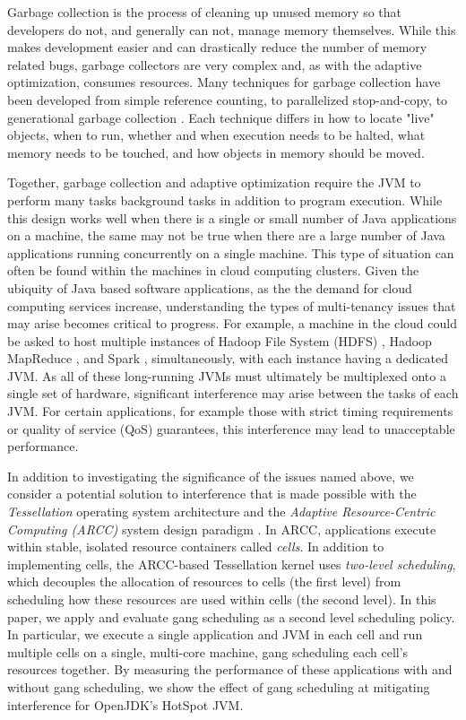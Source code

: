 \documentclass{sig-alternate}
\begin{document}
Garbage collection is the process of cleaning up unused memory so that developers do not, and generally can not, manage memory themselves. While this makes development easier and can drastically reduce the number of memory related bugs, garbage collectors are very complex and, as with the adaptive optimization, consumes resources. Many techniques for garbage collection have been developed from simple reference counting, to parallelized stop-and-copy, to generational garbage collection \cite{lins1996garbage}. Each technique differs in how to locate "live" objects, when to run, whether and when execution needs to be halted, what memory needs to be touched, and how objects in memory should be moved.

Together, garbage collection and adaptive optimization require the JVM to perform many tasks background tasks in addition to program execution. While this design works well when there is a single or small number of Java applications on a machine, the same may not be true when there are a large number of Java applications running concurrently on a single machine. This type of situation can often be found within the machines in cloud computing clusters. Given the ubiquity of Java based software applications, as the the demand for cloud computing services increase, understanding the types of multi-tenancy issues that may arise becomes critical to progress. For example, a machine in the cloud could be asked to host multiple instances of Hadoop File System (HDFS) \cite{shvachko2010hadoop}, Hadoop MapReduce \cite{bialecki2005hadoop}, and Spark \cite{zaharia2010spark}, simultaneously, with each instance having a dedicated JVM. As all of these long-running JVMs must ultimately be multiplexed onto a single set of hardware, significant interference may arise between the tasks of each JVM. For certain applications, for example those with strict timing requirements or quality of service (QoS) guarantees, this interference may lead to unacceptable performance.

In addition to investigating the significance of the issues named above, we consider a potential solution to interference that is made possible with the \textit{Tessellation} operating system architecture and the \textit{Adaptive Resource-Centric Computing (ARCC)} system design paradigm \cite{colmenares2010resource, colmenares2013tessellation, liu2009tessellation}. In ARCC, applications execute within stable, isolated resource containers called \textit{cells}. In addition to implementing cells, the ARCC-based Tessellation kernel uses \textit{two-level scheduling}, which decouples the allocation of resources to cells (the first level) from scheduling how these resources are used within cells (the second level). In this paper, we apply and evaluate gang scheduling \cite{feitelson1992gang} as a second level scheduling policy. In particular, we execute a single application and JVM in each cell and run multiple cells on a single, multi-core machine, gang scheduling each cell's resources together. By measuring the performance of these applications with and without gang scheduling, we show the effect of gang scheduling at mitigating interference for OpenJDK's HotSpot JVM.
\end{document}
